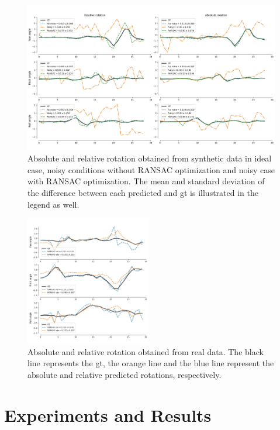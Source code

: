 \begin{figure}
  \centering
  \includegraphics[width=1\textwidth]{./content/experiments/figures/syn-res.jpeg}
  \caption{Absolute and relative rotation obtained from synthetic data in ideal
  case, noisy conditions without RANSAC optimization and noisy case with RANSAC
optimization. The mean and standard deviation of the difference between each
predicted and \gls{gt} is illustrated in the legend as well.}
  \label{fig:res-syn}
\end{figure}

\begin{figure}
  \centering
  \includegraphics[width=0.49\textwidth]{./content/experiments/figures/real-res.jpeg}
  \caption{Absolute and relative rotation obtained from real data. The black
    line represents the \gls{gt}, the orange line and the blue line represent
    the absolute and relative predicted rotations, respectively.}
  \label{fig:res-real}
\end{figure}


\section{Experiments and Results}
\label{sec:exp-res}

